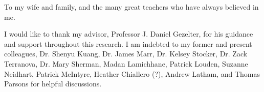 \documentclass[draft]{nddiss2e}
\begin{document}
\begin{dedication}
To my wife and family, and the many great teachers who have always believed in me.
\end{dedication}

\tableofcontents
\listoffigures
\listoftables



\begin{acknowledge}
I would like to thank my advisor, Professor J. Daniel Gezelter, for his
guidance and support throughout this research.
I am indebted to my former and present colleagues, Dr. Shenyu Kuang, Dr. James Marr, Dr. Kelsey Stocker, Dr. Zack Terranova, Dr. Mary Sherman, Madan Lamichhane, Patrick Louden, Suzanne Neidhart, Patrick McIntyre, Heather Chiallero (?), Andrew Latham, and Thomas Parsons for helpful discussions. 
\end{acknowledge}
\end{document}
